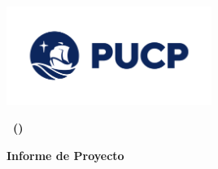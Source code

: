 \begin{titlepage}
    \centering
    {\Huge\bfseries \college \par}
    \vspace{1cm}
    {\Large\bfseries \faculty \par}
    \vspace{1cm}

    \includegraphics[width=0.5\textwidth]{images/pucp.png}

    \vspace{2cm}
    {\Large\bfseries \courseTitle\ (\courseCode) \par}
    \vspace{2cm}
    {\large\bfseries Informe de Proyecto \par}
    \vspace{1.5cm}
    \authors
    \vspace{2cm}
    {\large \noteDate \par}
    \vfill
\end{titlepage}